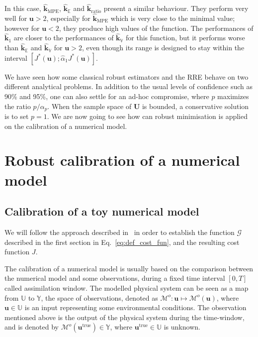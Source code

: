 \documentclass[preprint, review, 1p]{elsarticle}
\newcommand{\Ex}{\mathbb{E}}
\newcommand{\hatkmean}{\hat{\mathbf{k}}_{\Ex}}
\newcommand{\hatkvar}{\hat{\mathbf{k}}_{\mathbb{V}}}
\newcommand{\hatkmpe}{\hat{\mathbf{k}}_{\mathrm{MPE}}}
\newcommand{\RRE}{RRE}
\newcommand{\checka}{{\alpha}}
\newcommand{\checkk}{\mathbf{k}}
\newcommand{\Uspace}{\mathbb{U}}
\begin{document}
In this case, $\hatkmpe$, $\hatkmean$ and $\hat{\checkk}_{\mathrm{ratio}}$ present a similar behaviour.
They perform very well for $\mathbf{u}>2$, especially for $\hatkmpe$ which is very close to the minimal value; however for $\mathbf{u}<2$, they produce high values of the function.
The performances of $\hat{\checkk}_1$ are closer to the performances of $\hatkvar$ for this function, but it performs worse than $\hatkmean$ and $\hatkvar$ for $\mathbf{u}>2$, even though its range is designed to stay within the interval $[J^*(\mathbf{u}); \hat{\checka}_1 J^*(\mathbf{u})]$.



We have seen how some classical robust estimators and the \RRE{} behave on two different analytical problems. In addition to the usual levels of confidence such as 90\% and 95\%, one can also settle for an ad-hoc compromise, where $p$ maximizes the ratio $p/\alpha_p$. When the sample space of $\mathbf{U}$ is bounded, a conservative solution is to set $p=1$.
We are now going to see how can robust minimisation is applied on the calibration of a numerical model.

\section{Robust calibration of a numerical model}
\label{sec:SWE_application}

\subsection{Calibration of a toy numerical model}
 We will follow the approach described in~\cite{kennedy_bayesian_2001} in order to establish the function $\mathcal{G}$ described in the first section in Eq.~\eqref{eq:def_cost_fun}, and the resulting cost function $J$.
 
 The calibration of a numerical model is usually based on the comparison between the numerical model and some observations, during a fixed time interval $[0, T]$ called assimilation window.
 The modelled physical system can be seen as a map from $\Uspace$ to $\mathbb{Y}$, the space of observations, denoted as $\mathcal{M}^o : \mathbf{u}\mapsto \mathcal{M}^o(\mathbf{u})$, where $\mathbf{u}\in\Uspace$ is an input representing some environmental conditions. The observation mentioned above is the output of the physical system during the time-window, and is denoted by $\mathcal{M}^o(\mathbf{u}^{\mathrm{true}}) \in \mathbb{Y}$, where $\mathbf{u}^{\mathrm{true}} \in \Uspace$ is unknown.
\end{document}
